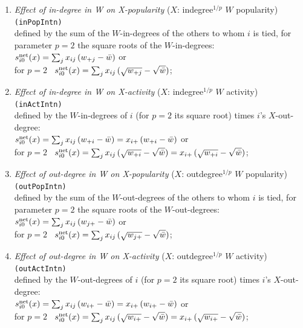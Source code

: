 \documentclass[a4paper,fleqn,11pt]{article}
\newcommand{\+}{\, + \,}
\newcommand{\vit}{\theenumi}
\newcounter{savenumi}
\begin{document}
\begin{enumerate}
\setcounter{enumi}{\value{savenumi}}
 \item {\em Effect of in-degree in W on X-popularity } ($X$: indegree$^{1/p}$ $W$ popularity)   \texttt{(inPopIntn)}\\
 defined by   the sum of  the $W$-in-degrees of the others to whom $i$ is tied,
 for parameter $p = 2$ the square roots of the $W$-in-degrees:\\
 $s^{\rm net}_{i\vit}(x) =  \sum_j x_{ij}\, ({w_{+j}} - {\bar w})  $ or\\
for $p=2$ \  $s^{\rm net}_{i\vit}(x) =  \sum_j x_{ij}\, (\sqrt{w_{+j}} - \sqrt{\bar w})  $;\\

 \item {\em Effect of in-degree in W on X-activity } ($X$: indegree$^{1/p}$ $W$ activity)  \texttt{(inActIntn)}\\
 defined by the $W$-in-degrees of $i$ (for $p = 2$ its square root)
 times $i$'s $X$-out-degree:\\
 $s^{\rm net}_{i\vit}(x) =  \sum_j x_{ij}\, ({w_{+i}} - {\bar w})
                 =  x_{i+}\, ({w_{+i}} - {\bar w}) $ or\\
for $p=2$ \  $s^{\rm net}_{i\vit}(x) =  \sum_j x_{ij}\, (\sqrt{w_{+i}} - \sqrt{\bar w})
                 =  x_{i+}\, (\sqrt{w_{+i}} - \sqrt{\bar w}) $;\\

 \item {\em Effect of out-degree in W on X-popularity } ($X$: outdegree$^{1/p}$ $W$ popularity) \texttt{(outPopIntn)}\\
 defined by   the sum of  the $W$-out-degrees of the others to whom $i$ is tied,
 for parameter $p = 2$ the square roots of the $W$-out-degrees:\\
 $s^{\rm net}_{i\vit}(x) =  \sum_j x_{ij}\, ({w_{j+}} - {\bar w})$ or\\
for $p=2$ \  $s^{\rm net}_{i\vit}(x) =  \sum_j x_{ij}\, (\sqrt{w_{j+}} - \sqrt{\bar w})$;\\

 \item {\em Effect of out-degree  in W on X-activity } ($X$: outdegree$^{1/p}$ $W$ activity) \texttt{(outActIntn)}\\
 defined by the $W$-out-degrees of $i$ (for $p = 2$ its square root)
 times $i$'s $X$-out-degree:\\
 $s^{\rm net}_{i\vit}(x) =  \sum_j x_{ij}\, ({w_{i+}} - {\bar w}) =
                           x_{i+}\, ({w_{i+}} - {\bar w}) $ or\\
for $p=2$ \  $s^{\rm net}_{i\vit}(x) =  \sum_j x_{ij}\, (\sqrt{w_{i+}} - \sqrt{\bar w}) =
                           x_{i+}\, (\sqrt{w_{i+}} - \sqrt{\bar w}) $;\\


\end{enumerate}
\end{document}
